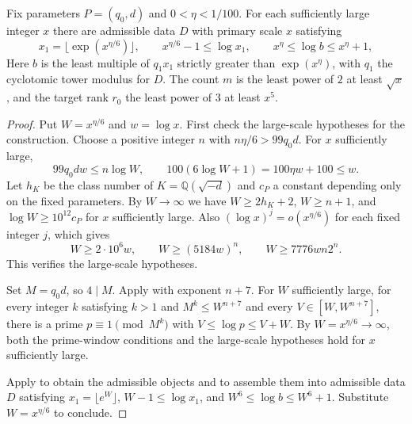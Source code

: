 \begin{lemma}
\label{lem:data-existence}
\emitthmsource
Fix parameters $P=(q_0,d)$ and $0<\eta<1/100$. For each sufficiently large integer $x$ there are admissible data $D$ with primary scale $x$ satisfying
\[
 x_1=\lfloor\exp(x^{\eta/6})\rfloor,\qquad
 x^{\eta/6}-1\le \log x_1,\qquad x^\eta\le\log b\le x^\eta+1,
\]
Here $b$ is the least multiple of $q_1x_1$ strictly greater than $\exp(x^\eta)$, with $q_1$ the cyclotomic tower modulus for $D$. The count $m$ is the least power of $2$ at least $\sqrt{x}$, and the target rank $r_0$ the least power of $3$ at least $x^5$.
\end{lemma}
\begin{proof}
Put $W=x^{\eta/6}$ and $w=\log x$. First check the large-scale hypotheses for the construction. Choose a positive integer $n$ with $n\eta/6>99q_0d$. For $x$ sufficiently large,
\[
 99q_0dw\le n\log W,\qquad
 100(6\log W+1)=100\eta w+100\le w.
\]
Let $h_K$ be the class number of $K=\mathbb Q(\sqrt{-d})$ and $c_P$ a constant depending only on the fixed parameters. By $W\to\infty$ we have $W\ge2h_K+2$, $W\ge n+1$, and $\log W\ge10^{12}c_P$ for $x$ sufficiently large. Also $(\log x)^j=o(x^{\eta/6})$ for each fixed integer $j$, which gives
\[
 W\ge 2\cdot10^6w,\qquad W\ge(5184w)^n,\qquad
 W\ge7776wn2^n.
\]
This verifies the large-scale hypotheses.

Set $M=q_0d$, so $4\mid M$. Apply  with exponent $n+7$. For $W$ sufficiently large, for every integer $k$ satisfying $k>1$ and $M^k\le W^{n+7}$ and every $V\in[W,W^{n+7}]$, there is a prime $p\equiv1\pmod{M^k}$ with $V\le\log p\le V+W$. By $W=x^{\eta/6}\to\infty$, both the prime-window conditions and the large-scale hypotheses hold for $x$ sufficiently large.

Apply  to obtain the admissible objects and  to assemble them into admissible data $D$ satisfying $x_1=\lfloor e^W\rfloor$, $W-1\le\log x_1$, and $W^6\le\log b\le W^6+1$. Substitute $W=x^{\eta/6}$ to conclude.
\end{proof}

